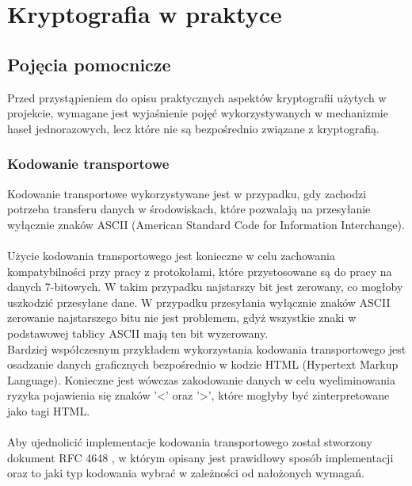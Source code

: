 \chapter{Kryptografia w praktyce}

\section{Pojęcia pomocnicze}
Przed przystąpieniem do opisu praktycznych aspektów kryptografii użytych w projekcie, wymagane jest 
wyjaśnienie pojęć wykorzystywanych w mechanizmie haseł jednorazowych, lecz które nie są bezpośrednio 
związane z kryptografią. 

\subsection{Kodowanie transportowe}
Kodowanie transportowe wykorzystywane jest w przypadku, gdy zachodzi potrzeba transferu danych
w środowiskach, które pozwalają na przesyłanie wyłącznie znaków ASCII (American Standard Code for Information Interchange). \\ \\
Użycie kodowania transportowego jest konieczne w celu zachowania kompatybilności przy pracy z protokołami, 
które przystosowane są do pracy na danych 7-bitowych. W takim przypadku najstarszy bit jest zerowany, co
mogłoby uszkodzić przesyłane dane. W przypadku przesyłania wyłącznie znaków ASCII zerowanie najstarszego bitu
nie jest problemem, gdyż wszystkie znaki w podstawowej tablicy ASCII mają ten bit wyzerowany.\\
Bardziej współczesnym przykładem wykorzystania kodowania transportowego jest osadzanie danych graficznych bezpośrednio w kodzie HTML (Hypertext Markup Language). Konieczne jest wówczas zakodowanie danych w celu wyeliminowania ryzyka pojawienia się znaków '<' oraz '>', które mogłyby być zinterpretowane jako tagi HTML. \\ \\
Aby ujednolicić implementacje kodowania transportowego został stworzony dokument RFC 4648 \cite{encoding}, w którym opisany jest prawidłowy sposób implementacji oraz to jaki typ kodowania wybrać w zależności od nałożonych wymagań.

